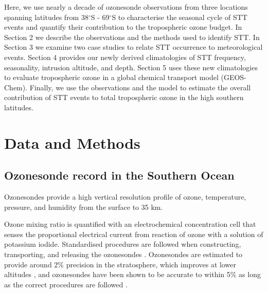 \documentclass{article}
\begin{document}


    Here, we use nearly a decade of ozonesonde observations from three locations spanning latitudes from 38$^{\circ}$S - 69$^{\circ}$S to characterise the seasonal cycle of STT events and quantify their contribution to the tropospheric ozone budget. 
    In Section 2 we describe the observations and the methods used to identify STT. 
    In Section 3 we examine two case studies to relate STT occurrence to meteorological events.
    Section 4 provides our newly derived climatologies of STT frequency, seasonality, intrusion altitude, and depth. 
    Section 5 uses these new climatologies to evaluate tropospheric ozone in a global chemical transport model (GEOS-Chem). 
    Finally, we use the observations and the model to estimate the overall contribution of STT events to total tropospheric ozone in the high southern latitudes.

\section{Data and Methods}

  \subsection{Ozonesonde record in the Southern Ocean}
  \label{Section:ozonesondes}
    Ozonesondes provide a high vertical resolution profile of ozone, temperature, pressure, and humidity from the surface to 35 km.
    
    Ozone mixing ratio is quantified with an electrochemical concentration cell that senses the proportional electrical current from reaction of ozone with a solution of potassium iodide.
    Standardised procedures are followed when constructing, transporting, and releasing the ozonesondes \citep{noaasondes}.
    Ozonesondes are estimated to provide around 2\% precision in the stratosphere, which improves at lower altitudes \citep{noaasondes}, and ozonesondes have been shown to be accurate to within 5\% as long as the correct procedures are followed \citep{Smit2007}.
    
\end{document}
